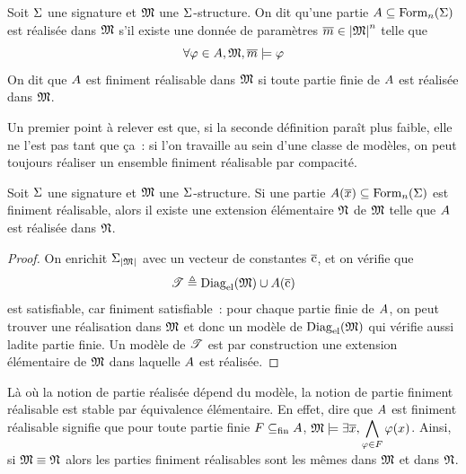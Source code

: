 \begin{definition}
  Soit $\Sigma$ une signature et $\mathfrak{M}$ une $\Sigma$-structure. On dit qu'une
  partie $A\subseteq\operatorname{Form}_n(\Sigma)$ est réalisée dans $\mathfrak{M}$ s'il
  existe une donnée de paramètres $\overline{m} \in \left\vert \mathfrak{M}\right\vert^n$ telle que
  \[\forall \varphi \in A, \mathfrak{M},\overline{m} \models\varphi\]
  On dit que $A$ est finiment réalisable dans $\mathfrak{M}$ si toute partie
  finie de $A$ est réalisée dans $\mathfrak{M}$.
\end{definition}

Un premier point à relever est que, si la seconde définition paraît plus faible,
elle ne l'est pas tant que ça~: si l'on travaille au sein d'une classe de
modèles, on peut toujours réaliser un ensemble finiment réalisable par
compacité.

\begin{proposition}
  Soit $\Sigma$ une signature et $\mathfrak{M}$ une $\Sigma$-structure. Si une partie
  $A(\overline{x})\subseteq\operatorname{Form}_n(\Sigma)$ est finiment réalisable, alors il
  existe une extension élémentaire $\mathfrak{N}$ de $\mathfrak{M}$ telle que $A$ est
  réalisée dans $\mathfrak{N}$.
\end{proposition}

\begin{proof}
  On enrichit $\Sigma_{\left\vert \mathfrak{M}\right\vert}$ avec un vecteur de constantes $\overline{\mathrm{c}}$, et on
  vérifie que
  \[\mathscr T \triangleq \operatorname{Diag}_{\mathrm{el}}(\mathfrak{M})\cup A(\overline{\mathrm{c}})\]
  est satisfiable, car finiment satisfiable~: pour chaque partie finie de
  $A$, on peut trouver une réalisation dans $\mathfrak{M}$ et donc un modèle
  de $\operatorname{Diag}_{\mathrm{el}}(\mathfrak{M})$ qui vérifie aussi ladite partie finie. Un modèle de
  $\mathscr T$ est par construction une extension élémentaire de $\mathfrak{M}$ dans
  laquelle $A$ est réalisée.
\end{proof}

\begin{remark}
  Là où la notion de partie réalisée dépend du modèle, la notion de partie
  finiment réalisable est stable par équivalence élémentaire. En effet, dire
  que $A$ est finiment réalisable signifie que pour toute partie
  finie $F\subseteq_{\mathrm{fin}}A$,
  $\mathfrak{M}\models\displaystyle\exists \overline{x},\bigwedge_{\varphi \in F}\varphi(x)$.
  Ainsi, si $\mathfrak{M}\equiv \mathfrak{N}$ alors les parties finiment réalisables sont
  les mêmes dans $\mathfrak{M}$ et dans $\mathfrak{N}$.
\end{remark}


